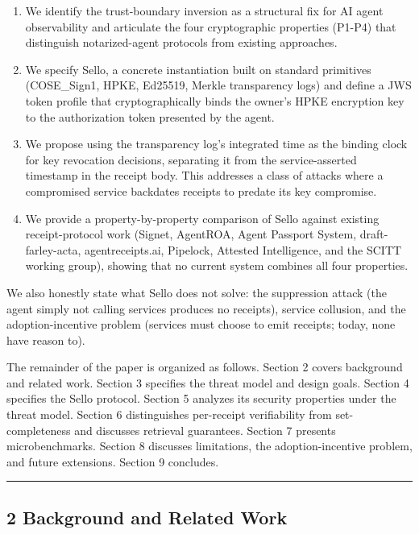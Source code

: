 \documentclass[
  11pt,
]{article}
\begin{document}
\begin{enumerate}
\def\labelenumi{\arabic{enumi}.}
\item
  We identify the trust-boundary inversion as a structural fix for AI
  agent observability and articulate the four cryptographic properties
  (P1-P4) that distinguish notarized-agent protocols from existing
  approaches.
\item
  We specify Sello, a concrete instantiation built on standard
  primitives (COSE\_Sign1, HPKE, Ed25519, Merkle transparency logs) and
  define a JWS token profile that cryptographically binds the owner's
  HPKE encryption key to the authorization token presented by the agent.
\item
  We propose using the transparency log's integrated time as the binding
  clock for key revocation decisions, separating it from the
  service-asserted timestamp in the receipt body. This addresses a class
  of attacks where a compromised service backdates receipts to predate
  its key compromise.
\item
  We provide a property-by-property comparison of Sello against existing
  receipt-protocol work (Signet, AgentROA, Agent Passport System,
  draft-farley-acta, agentreceipts.ai, Pipelock, Attested Intelligence,
  and the SCITT working group), showing that no current system combines
  all four properties.
\end{enumerate}

We also honestly state what Sello does not solve: the suppression attack
(the agent simply not calling services produces no receipts), service
collusion, and the adoption-incentive problem (services must choose to
emit receipts; today, none have reason to).

The remainder of the paper is organized as follows. Section 2 covers
background and related work. Section 3 specifies the threat model and
design goals. Section 4 specifies the Sello protocol. Section 5 analyzes
its security properties under the threat model. Section 6 distinguishes
per-receipt verifiability from set-completeness and discusses retrieval
guarantees. Section 7 presents microbenchmarks. Section 8 discusses
limitations, the adoption-incentive problem, and future extensions.
Section 9 concludes.

\begin{center}\rule{0.5\linewidth}{0.5pt}\end{center}

\hypertarget{background-and-related-work}{%
\subsection{2 Background and Related
Work}\label{background-and-related-work}}
\end{document}
